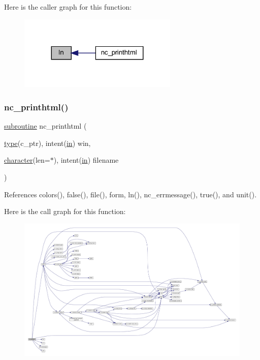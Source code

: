 Here is the caller graph for this function\+:
\nopagebreak
\begin{figure}[H]
\begin{center}
\leavevmode
\includegraphics[width=215pt]{nc__printhtml_8f90_a95070803517ce3fa7f43d9adcda31274_icgraph}
\end{center}
\end{figure}
\mbox{\label{nc__printhtml_8f90_a32e95e7d4144cd8b7fb58ff6974441a8}} 
\subsubsection{\texorpdfstring{nc\+\_\+printhtml()}{nc\_printhtml()}}
{\footnotesize\ttfamily \hyperlink{M__stopwatch_83_8txt_acfbcff50169d691ff02d4a123ed70482}{subroutine} nc\+\_\+printhtml (\begin{DoxyParamCaption}\item[{\hyperlink{stop__watch_83_8txt_a70f0ead91c32e25323c03265aa302c1c}{type}(c\+\_\+ptr), intent(\hyperlink{M__journal_83_8txt_afce72651d1eed785a2132bee863b2f38}{in})}]{win,  }\item[{\hyperlink{option__stopwatch_83_8txt_abd4b21fbbd175834027b5224bfe97e66}{character}(len=$\ast$), intent(\hyperlink{M__journal_83_8txt_afce72651d1eed785a2132bee863b2f38}{in})}]{filename }\end{DoxyParamCaption})}



References colors(), false(), file(), form, ln(), nc\+\_\+errmessage(), true(), and unit().

Here is the call graph for this function\+:
\nopagebreak
\begin{figure}[H]
\begin{center}
\leavevmode
\includegraphics[width=350pt]{nc__printhtml_8f90_a32e95e7d4144cd8b7fb58ff6974441a8_cgraph}
\end{center}
\end{figure}
